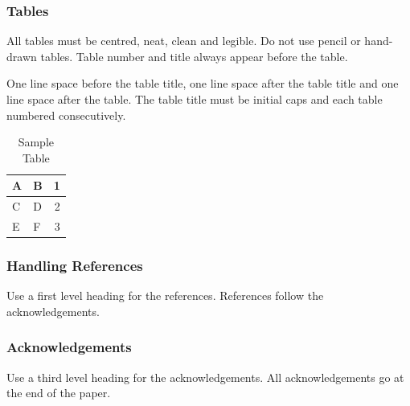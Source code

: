 \documentclass[a4paper]{article}
\begin{document}
\subsubsection{Tables}

All tables must be centred, neat, clean and legible. Do not use pencil
or hand-drawn tables. Table number and title always appear before the
table.

One line space before the table title, one line space after the table
title and one line space after the table. The table title must be
initial caps and each table numbered consecutively.

\begin{table}[ht]
\begin{center}
\caption{Sample Table}

\bigskip

\begin{tabular}{|l|l|r|}
\hline
A & B & 1\\ \hline
C & D & 2\\
E & F & 3\\ \hline
\end{tabular}
\end{center}
\end{table}


\subsubsection{Handling References}

Use a first level heading for the references. References follow the
acknowledgements.


\subsubsection{Acknowledgements}

Use a third level heading for the acknowledgements. All acknowledgements
go at the end of the paper.


 


%
%
%
\end{document}
